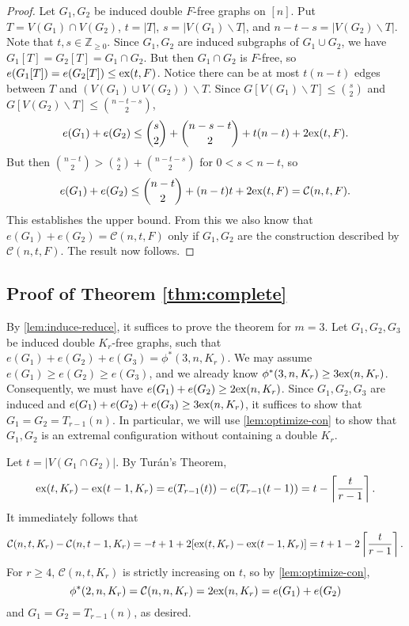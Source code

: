 \documentclass[12pt]{article}
\newcommand*{\Z}{\mathbb{Z}}
\newcommand*{\ex}{\textnormal{ex}}
\newcommand*{\con}{\mathcal{C}}
\begin{document}
\begin{proof}
  Let $G_1, G_2$ be induced double $F$-free graphs on $[n]$. Put $T = V(G_1) \cap V(G_2)$, $t = |T|$, $s = |V(G_1) \backslash T|$, and $n - t - s = |V(G_2) \backslash T|$. Note that $t, s \in \Z_{\geq 0}$. Since $G_1, G_2$ are induced subgraphs of $G_1 \cup G_2$, we have $G_1[T] = G_2[T] = G_1 \cap G_2$. But then $G_1 \cap G_2$ is $F$-free, so $e(G_1[T]) = e(G_2[T]) \leq \ex(t, F)$. Notice there can be at most $t(n - t)$ edges between $T$ and $(V(G_1) \cup V(G_2)) \backslash T$. Since $G[V(G_1) \backslash T] \leq \binom{s}{2}$ and $G[V(G_2) \backslash T] \leq \binom{n - t - s}{2}$,
  \[
    e(G_1) + e(G_2) \leq \binom{s}{2} + \binom{n - s - t}{2} + t(n - t) + 2\ex(t, F).
  \]
  But then $\binom{n - t}{2} > \binom{s}{2} + \binom{n - t - s}{2}$ for $0 < s < n - t$, so
  \[
    e(G_1) + e(G_2) \leq \binom{n - t}{2} + (n - t)t + 2\ex(t, F) = \con(n, t, F).
  \]
  This establishes the upper bound. From this we also know that $e(G_1) + e(G_2) = \con(n, t, F)$ only if $G_1, G_2$ are the construction described by $\con(n, t, F)$. The result now follows.
\end{proof}

\subsection{Proof of Theorem \ref{thm:complete}}

  By \cref{lem:induce-reduce}, it suffices to prove the theorem for $m = 3$. Let $G_1, G_2, G_3$ be induced double $K_r$-free graphs, such that $e(G_1) + e(G_2) + e(G_3) = \phi^*(3, n, K_r)$. We may assume $e(G_1) \geq e(G_2) \geq e(G_3)$, and we already know $\phi^*(3, n, K_r) \geq 3\ex(n, K_r)$. Consequently, we must have $e(G_1) + e(G_2) \geq 2\ex(n, K_r)$. Since $G_1, G_2, G_3$ are induced and $e(G_1) + e(G_2) + e(G_3) \geq 3\ex(n, K_r)$, it suffices to show that $G_1 = G_2 = T_{r - 1}(n)$. In particular, we will use \cref{lem:optimize-con} to show that $G_1, G_2$ is an extremal configuration without containing a double $K_r$. 

  Let $t = |V(G_1 \cap G_2)|$. By Turán's Theorem,
  \[
    \ex(t, K_{r}) - \ex(t - 1, K_{r}) = e(T_{r - 1}(t)) - e(T_{r - 1}(t - 1)) = t - \left\lceil \frac{t}{r - 1} \right\rceil.
  \]
  It immediately follows that
  \begin{equation}
    \con(n, t, K_r) - \con(n, t - 1, K_r) = - t + 1 + 2[\ex(t, K_r) - \ex(t - 1, K_r)] = t + 1 - 2\left\lceil \frac{t}{r - 1} \right\rceil. \label{eq:con1}
  \end{equation}
  For $r \geq 4$, $\con(n, t, K_r)$ is strictly increasing on $t$, so by \cref{lem:optimize-con}, 
  \[
    \phi^*(2, n, K_r) = \con(n, n, K_r) = 2\ex(n, K_r) = e(G_1) + e(G_2)
  \]
  and $G_1 = G_2 = T_{r - 1}(n)$, as desired. 
\end{document}
